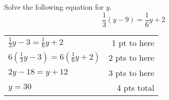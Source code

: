 {
	Solve the following equation for $y$. $$\frac{1}{3}(y-9)=  \frac{1}{6} y+2$$
}
{
	\begin{tabular}{l r}
	$\frac{1}{3}y-3=  \frac{1}{6} y+2$  & 1 pt to here\\
	$6\left(\frac{1}{3}y-3\right)=6 \left( \frac{1}{6} y+2\right)$  & 2 pts to here\\
	$2y-18=y+12$ & 3 pts to here\\
	$y=30$  & 4 pts total
	\end{tabular}
}

